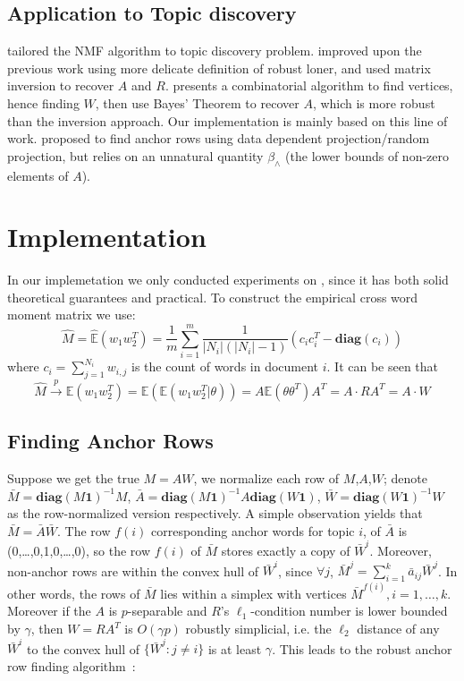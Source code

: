 \documentclass{article}
\def\E{\mathbb{E}}
\def\diag{\mathbf{diag}}
\def\ones{\mathbf{1}}
\begin{document}
\subsection{Application to Topic discovery}
\cite{AGM12,AGH+13} tailored the NMF algorithm to topic discovery problem. \cite{AGM12} improved upon the previous work using more delicate definition of robust loner, and used matrix inversion to recover $A$ and $R$. \cite{AGH+13} presents a combinatorial algorithm to find vertices, hence finding $W$, then use Bayes' Theorem to recover $A$, which is more robust than the inversion approach. Our implementation is mainly based on this line of work. \cite{DRIS13} proposed to find anchor rows using data dependent projection/random projection, but relies on an unnatural quantity $\beta_{\wedge}$ (the lower bounds of non-zero elements of $A$).

\section{Implementation}
In our implemetation we only conducted experiments on \cite{AGH+13}, since it has both solid theoretical guarantees and practical. To construct the empirical cross word moment matrix we use:
$$
\hat{M} = \hat{\E}(w_1 w_2^T) = \frac{1}{m}\sum_{i=1}^{m}\frac{1}{|N_i|(|N_i|-1)}(c_i c_i^T - \diag(c_i))
$$
where $c_i = \sum_{j=1}^{N_i} w_{i,j}$ is the count of words in document $i$.
It can be seen that
$$
\hat{M} \overset{p}{\to} \E(w_1 w_2^T) = \E(\E(w_1  w_2^T|\theta))= A\E(\theta \theta^T)A^T = A \cdot RA^T = A \cdot W
$$

\subsection{Finding Anchor Rows}
Suppose we get the true $M = AW$, we normalize each row of $M$,$A$,$W$; denote $\bar{M} = \diag(M \ones)^{-1} M$, $\bar{A} = \diag(M \ones)^{-1} A \diag(W \ones)$, $\bar{W} = \diag(W \ones)^{-1} W$ as the row-normalized version respectively. A simple observation yields that $\bar{M} = \bar{A}\bar{W}$. The row $f(i)$ corresponding anchor words for topic $i$, of $\bar{A}$ is (0,\ldots,0,1,0,\ldots,0), so the row $f(i)$ of $\bar{M}$ stores exactly a copy of $\bar{W}^i$. Moreover, non-anchor rows are within the convex hull of $\bar{W}^i$, since $\forall j$, $\bar{M}^j = \sum_{i=1}^k \bar{a}_{ij} \bar{W}^j$. In other words, the rows of $\bar{M}$ lies within a simplex with vertices $\bar{M}^{f(i)}, i = 1, \ldots, k$. Moreover if the $A$ is $p$-separable and $R$'s $\ell_1$-condition number is lower bounded by $\gamma$, then $W = RA^T$ is $O(\gamma p)$ robustly simplicial, i.e. the $\ell_2$ distance of any $\bar{W}^i$ to the convex hull of $\{ \bar{W}^j: j \neq i \}$ is at least $\gamma$. This leads to the robust anchor row finding algorithm~\cite{AGH+13}:
\end{document}
